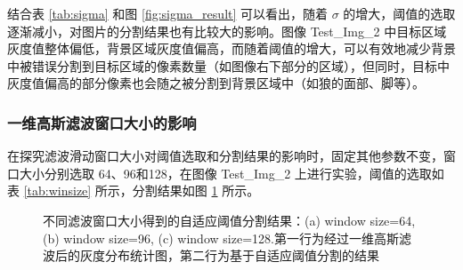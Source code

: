 结合表 \ref{tab:sigma} 和图 \ref{fig:sigma_result} 可以看出，随着 $\sigma$ 的增大，阈值的选取逐渐减小，对图片的分割结果也有比较大的影响。图像 Test\_Img\_2 中目标区域灰度值整体偏低，背景区域灰度值偏高，而随着阈值的增大，可以有效地减少背景中被错误分割到目标区域的像素数量（如图像右下部分的区域），但同时，目标中灰度值偏高的部分像素也会随之被分割到背景区域中（如狼的面部、脚等）。 

\subsubsection{一维高斯滤波窗口大小的影响}

在探究滤波滑动窗口大小对阈值选取和分割结果的影响时，固定其他参数不变，窗口大小分别选取 64、96和128，在图像 Test\_Img\_2 上进行实验，阈值的选取如表 \ref{tab:winsize} 所示，分割结果如图 \ref{fig:winsize_result} 所示。

\begin{table}[!ht]
\vspace{0.03cm}
\caption{不同滤波窗口大小得到的自适应阈值表}
\label{tab:winsize}
\end{table}

\begin{figure}[!ht]
	\vspace{-0.8cm}
  \centering
  \begin{minipage}[b]{\linewidth} 	
  \end{minipage}
  \vfill
  \caption{不同滤波窗口大小得到的自适应阈值分割结果：(a) window size=64, (b) window size=96, (c) window size=128.第一行为经过一维高斯滤波后的灰度分布统计图，第二行为基于自适应阈值分割的结果}
  \label{fig:winsize_result}
\end{figure}

